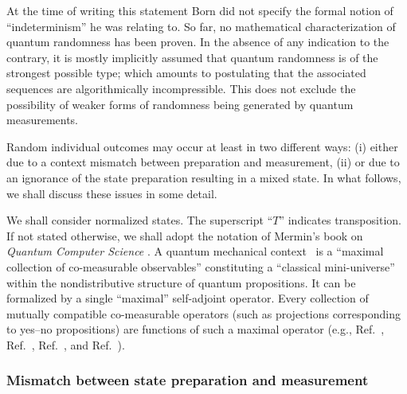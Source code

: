 \documentclass[%
 preprint,
 showpacs,
 showkeys,
 preprintnumbers,
 amsmath,amssymb,
 aps,
 prl,
  longbibliography,
 ]{revtex4-1}
\begin{document}
At the time of writing this statement Born did not specify the formal notion of ``indeterminism'' he was relating to.
So far, no mathematical characterization of quantum randomness has been proven.
In the absence of any indication to the contrary, it is mostly implicitly assumed
that quantum randomness is of the strongest possible type;
which amounts to postulating that the associated sequences are algorithmically incompressible.
This does not exclude the possibility of weaker forms of randomness being generated by quantum measurements.


Random individual outcomes may occur at least in two different ways:
(i) either due to a context mismatch between preparation and measurement,
(ii) or
due to an ignorance of the state preparation resulting in a mixed state.
In what follows, we shall discuss these issues in some detail.


We shall consider normalized states.
The superscript ``$T$'' indicates transposition.
If not stated otherwise, we shall adopt the notation of Mermin's book on {\em Quantum Computer Science}
\cite{mermin-07}.
A quantum mechanical context~\cite{svozil-2008-ql}
is a ``maximal collection of co-measurable observables'' constituting
a ``classical mini-universe'' within the nondistributive structure of quantum propositions.
It can be formalized by a single  ``maximal'' self-adjoint operator.
Every collection of mutually compatible co-measurable operators (such as projections corresponding to yes--no propositions)
are functions of such a maximal operator
(e.g., Ref.~\cite[Sec.~II.10, p. 90, English translation p.~173]{v-neumann-49},
Ref.~\cite[\S~2]{kochen1}, Ref.~\cite[pp.~227,228]{neumark-54}, and Ref.~\cite[\S~84]{halmos-vs}).


\subsubsection{Mismatch between state preparation and measurement}
\label{2009-QvPR-s-mismatch}
\end{document}
